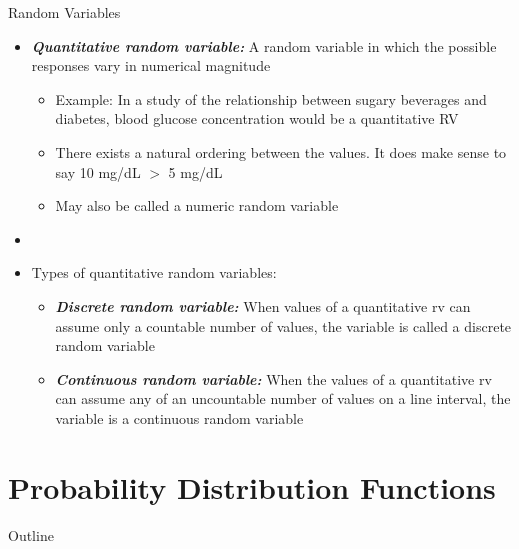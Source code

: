 \documentclass[xcolor=dvipsnames]{beamer}
\begin{document}
\begin{frame}{Random Variables}
	\begin{itemize}
		\item \textbf{\emph{Quantitative random variable:}} A random variable in which the possible responses vary in numerical magnitude
		\begin{itemize}
			\item Example: In a study of the relationship between sugary beverages and diabetes, blood glucose concentration would be a quantitative RV
			\item There exists a natural ordering between the values. It does make sense to say 10 mg/dL $>$ 5 mg/dL
			\item May also be called a numeric random variable
		\end{itemize}
	\item[]
	\item Types of quantitative random variables:
	\begin{itemize}
		\item \textbf{\emph{Discrete random variable:}} When values of a quantitative rv can assume only a countable number of values, the variable is called a discrete random variable
		\item \textbf{\emph{Continuous random variable:}} When the values of a quantitative rv can assume any of an uncountable number of values on a line interval, the variable is a continuous random variable
	\end{itemize}
	\end{itemize}
\end{frame}

\section{Probability Distribution Functions}
\begin{frame}{Outline}
	\tableofcontents[currentsection,subsectionstyle=show/shaded/hide]
\end{frame}
\end{document}

